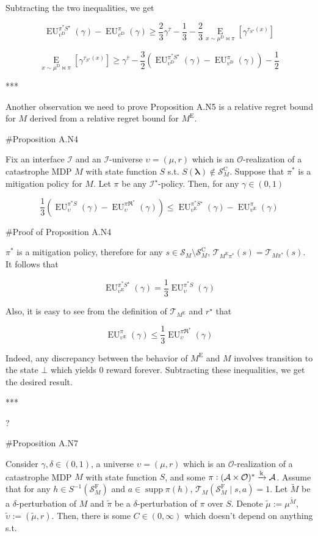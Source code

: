 \documentclass[a4paper]{article}
\DeclareMathOperator{\Supp}{supp}
\newcommand{\AP}[1]{\left(#1\right)}
\newcommand{\AB}[1]{\left[#1\right]}
\newcommand{\Ea}[2]{\underset{#1}{\operatorname{E}}\AB{#2}}
\newcommand{\Estr}{\boldsymbol{\lambda}}
\newcommand{\M}{\xrightarrow{\textnormal{k}}}
\newcommand{\Ob}{\mathcal{O}}
\newcommand{\A}{\mathcal{A}}
\newcommand{\St}{\mathcal{S}}
\newcommand{\T}{\mathcal{T}}
\newcommand{\In}{\mathcal{I}}
\newcommand{\FH}{(\A \times \Ob)^*}
\newcommand{\RMC}{\mathrm{C}}
\newcommand{\RMD}{\mathrm{D}}
\newcommand{\RME}{\mathrm{E}}
\newcommand{\RMF}{\mathrm{F}}
\newcommand{\SF}{\St^{\RMF}}
\newcommand{\SC}{\St^{\RMC}}
\newcommand{\ME}{M^{\RME}}
\newcommand{\UD}{\upsilon^{\RMD}}
\newcommand{\EU}{\operatorname{EU}}
\begin{document}
Subtracting the two inequalities, we get

$$\EU_{\UD}^{\pi^*S^\star}(\gamma) - \EU_{\UD}^\pi(\gamma) \geq \frac{2}{3}\gamma^{\bar{\tau}} - \frac{1}{3} - \frac{2}{3}\Ea{x\sim\mu^\RMD\bowtie\pi}{\gamma^{\tau_{S^\star}(x)}}$$

$$\Ea{x\sim\mu^\RMD\bowtie\pi}{\gamma^{\tau_{S^\star}(x)}} \geq \gamma^{\bar{\tau}} - \frac{3}{2}\AP{\EU_{\UD}^{\pi^*S^\star}(\gamma) - \EU_{\UD}^\pi(\gamma)}-\frac{1}{2}$$

***

Another observation we need to prove Proposition A.N5 is a relative regret bound for $M$ derived from a relative regret bound for $\ME$.

\#Proposition A.N4

Fix an interface $\In$ and an $\In$-universe $\upsilon=(\mu,r)$ which is an $\Ob$-realization of a catastrophe MDP $M$ with state function $S$ s.t. $S(\Estr)\not\in\SC_M$. Suppose that $\pi^*$ is a mitigation policy for $M$. Let $\pi$ be any $\In^\star$-policy. Then, for any $\gamma\in(0,1)$

$$\frac{1}{3}\AP{\EU_{\upsilon}^{\pi^* S}(\gamma)-\EU_{\upsilon}^{\pi\Re^*}(\gamma)} \leq \EU_{\upsilon^\RME}^{\pi^* S^\star}(\gamma)-\EU_{\upsilon^\RME}^{\pi}(\gamma)$$

\#Proof of Proposition A.N4

$\pi^*$ is a mitigation policy, therefore for any $s \in \St_M \setminus \SC_M$, $\T_{\ME\pi^*}(s)=\T_{M\pi^*}(s)$. It follows that 

$$\EU_{\upsilon^\RME}^{\pi^* S^\star}(\gamma) = \frac{1}{3}\EU_{\upsilon}^{\pi^* S}(\gamma)$$

Also, it is easy to see from the definition of $\T_{\ME}$ and $r^\star$ that

$$\EU_{\upsilon^\RME}^{\pi}(\gamma) \leq \frac{1}{3}\EU_{\upsilon}^{\pi\Re^*}(\gamma)$$

Indeed, any discrepancy between the behavior of $\ME$ and $M$ involves transition to the state $\bot$ which yields 0 reward forever. Subtracting these inequalities, we get the desired result.

***

?

\#Proposition A.N7

Consider $\gamma,\delta\in(0,1)$, a universe $\upsilon=(\mu,r)$ which is an $\Ob$-realization of a catastrophe MDP $M$ with state function $S$, and some $\pi: \FH \M \A$. Assume that for any $h \in S^{-1}\AP{\SF_M}$ and $a \in \Supp{\pi(h)}$, $\T_M\AP{\SF_M \mid s,a} = 1$. Let $\tilde{M}$ be a $\delta$-perturbation of $M$ and $\tilde{\pi}$ be a $\delta$-perturbation of $\pi$ over $S$. Denote $\tilde{\mu}:=\mu^{\tilde{M}}$, $\tilde{\upsilon}:=\AP{\tilde{\mu},r}$. Then, there is some $C\in(0,\infty)$ which doesn't depend on anything s.t.
\end{document}
